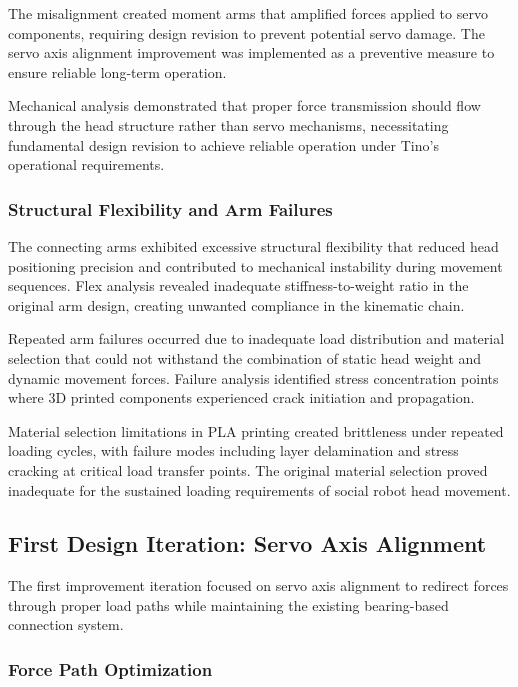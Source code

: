 The misalignment created moment arms that amplified forces applied to servo components, requiring design revision to prevent potential servo damage. The servo axis alignment improvement was implemented as a preventive measure to ensure reliable long-term operation.

Mechanical analysis demonstrated that proper force transmission should flow through the head structure rather than servo mechanisms, necessitating fundamental design revision to achieve reliable operation under Tino's operational requirements.

\subsubsection{Structural Flexibility and Arm Failures}

The connecting arms exhibited excessive structural flexibility that reduced head positioning precision and contributed to mechanical instability during movement sequences. Flex analysis revealed inadequate stiffness-to-weight ratio in the original arm design, creating unwanted compliance in the kinematic chain.

Repeated arm failures occurred due to inadequate load distribution and material selection that could not withstand the combination of static head weight and dynamic movement forces. Failure analysis identified stress concentration points where 3D printed components experienced crack initiation and propagation.

Material selection limitations in PLA printing created brittleness under repeated loading cycles, with failure modes including layer delamination and stress cracking at critical load transfer points. The original material selection proved inadequate for the sustained loading requirements of social robot head movement.

\subsection{First Design Iteration: Servo Axis Alignment}

The first improvement iteration focused on servo axis alignment to redirect forces through proper load paths while maintaining the existing bearing-based connection system.

\subsubsection{Force Path Optimization}

